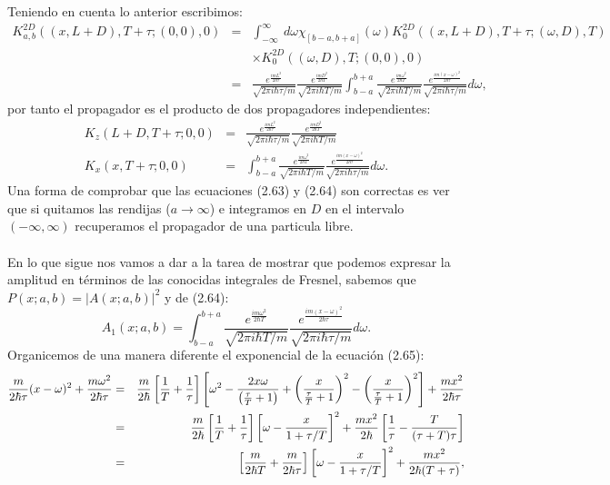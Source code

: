 Teniendo en cuenta lo anterior escribimos:
\begin{eqnarray}
\nonumber K_{a,b}^{2D}((x,L+D),T+\tau;(0,0),0)&=&\int_{-\infty}^{\infty}\ d\omega\chi_{[b-a,b+a]}(\omega)K_{0}^{2D}((x,L+D),T+\tau;(\omega,D),T)\\
&&\nonumber \times K_{0}^{2D}((\omega,D),T;(0,0),0)\\
&=&\nonumber \frac{e^{\frac{imL^{2}}{2\hbar\tau}}}{\sqrt{2\pi i\hbar\tau/m}}\frac{e^{\frac{imD^{2}}{2\hbar T}}}{\sqrt{2\pi i\hbar T/m}}\int_{b-a}^{b+a}\frac{e^{\frac{im\omega^{2}}{2\hbar T}}}{\sqrt{2\pi i\hbar T/m}}\frac{e^{\frac{im(x-\omega)^{2}}{2\hbar\tau}}}{\sqrt{2\pi i\hbar\tau/m}}d\omega ,	
\end{eqnarray}
por tanto el propagador es el producto de dos propagadores independientes:
\begin{eqnarray}
K_z(L+D,T+\tau;0,0)&=&\frac{e^{\frac{imL^{2}}{2\hbar\tau}}}{\sqrt{2\pi i\hbar\tau/m}}\frac{e^{\frac{imD^{2}}{2\hbar T}}}{\sqrt{2\pi i\hbar T/m}}\\
K_x(x,T+\tau;0,0)&=&\int_{b-a}^{b+a}\frac{e^{\frac{im\omega^{2}}{2\hbar T}}}{\sqrt{2\pi i\hbar T/m}}\frac{e^{\frac{im(x-\omega)^{2}}{2\hbar\tau}}}{\sqrt{2\pi i\hbar\tau/m}}d\omega .
\end{eqnarray}
Una forma de comprobar que las ecuaciones (2.63) y (2.64) son correctas es ver que si quitamos las rendijas ($a\to \infty$) e integramos en $D$ en el intervalo $(-\infty,\infty)$ recuperamos el propagador de una particula libre.\\
\\
En lo que sigue nos vamos a dar a la tarea de mostrar que podemos expresar la amplitud en términos de las conocidas integrales de Fresnel, sabemos que $P(x;a,b)=|A(x;a,b)|^2$ y de (2.64):
\begin{equation}
A_1(x;a,b)=\int_{b-a}^{b+a}\frac{e^{\frac{im\omega^{2}}{2\hbar T}}}{\sqrt{2\pi i\hbar T/m}}\frac{e^{\frac{im(x-\omega)^{2}}{2\hbar\tau}}}{\sqrt{2\pi i\hbar\tau/m}}d\omega .
\end{equation} 
Organicemos de una manera diferente el exponencial de la ecuación (2.65):
\begin{eqnarray}
\nonumber \frac{m}{2\hbar\tau}(x-\omega)^{2}+\frac{m\omega^{2}}{2\hbar\tau}&=&\frac{m}{2\hbar}\left[\frac{1}{T}+\frac{1}{\tau}\right]\left[\omega^{2}-\frac{2x\omega}{\left(\frac{\tau}{T}+1\right)}+\left(\frac{x}{\frac{\tau}{T}+1}\right)^{2}-\left(\frac{x}{\frac{\tau}{T}+1}\right)^{2}\right]+\frac{mx^{2}}{2\text{\ensuremath{\hbar\tau}}}\\
&=&\nonumber \frac{m}{2\hbar}\left[\frac{1}{T}+\frac{1}{\tau}\right]\left[\omega-\frac{x}{1+\tau/T}\right]^{2}+\frac{mx^{2}}{2\text{\ensuremath{\hbar}}}\left[\frac{1}{\tau}-\frac{T}{(\tau+T)\tau}\right]\\
&=& \left[\frac{m}{2\hbar T}+\frac{m}{2\hbar\tau}\right]\left[\omega-\frac{x}{1+\tau/T}\right]^{2}+\frac{mx^{2}}{2\text{\ensuremath{\hbar}}(T+\tau)},
\end{eqnarray}
